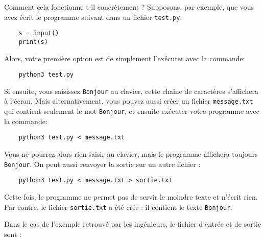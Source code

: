 \documentclass{article}
\begin{document}
Comment cela fonctionne t-il concrètement ? Supposons, par exemple,
que vous avez écrit le programme suivant dans un fichier \texttt{test.py}:
\begin{verbatim}
    s = input()
    print(s)
\end{verbatim}
Alors, votre première option est de simplement l'exécuter avec la commande:
\begin{verbatim}
    python3 test.py
\end{verbatim}
Si ensuite, vous saisissez \texttt{Bonjour} au clavier,
cette chaîne de caractères s'affichera à l'écran.
Mais alternativement,
vous pouvez aussi créer un fichier \texttt{message.txt}
qui contient seulement le mot \texttt{Bonjour},
et ensuite exécuter votre programme avec la commande:
\begin{verbatim}
    python3 test.py < message.txt
\end{verbatim}
Vous ne pourrez alors rien saisir au clavier,
mais le programme affichera toujours \texttt{Bonjour}.
On peut aussi renvoyer la sortie sur un autre fichier :
\begin{verbatim}
    python3 test.py < message.txt > sortie.txt
\end{verbatim}
Cette fois, le programme ne permet pas de servir le moindre texte
et n'écrit rien. Par contre, le fichier {\tt sortie.txt} a été crée : il contient
le texte \texttt{Bonjour}.

\bigskip

Dans le cas de l'exemple retrouvé par les ingénieurs, le fichier d'entrée et de sortie sont :
\end{document}
